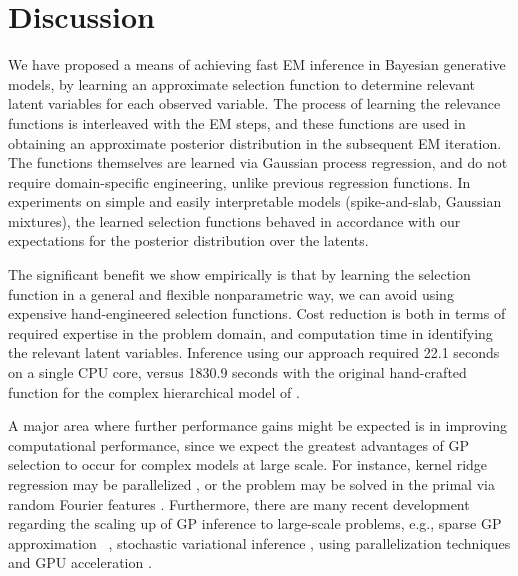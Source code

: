 \section{Discussion}
%
We have proposed a means of achieving fast EM inference in Bayesian generative models, by
learning an approximate selection function to determine relevant latent variables
for each observed variable. The process of learning the relevance functions
is interleaved with the EM steps, and these functions
are used in obtaining an approximate posterior distribution in the subsequent EM iteration.
The functions themselves are learned via Gaussian process regression,
and do not require domain-specific engineering, unlike previous regression functions.
In experiments on simple and easily interpretable models (spike-and-slab, Gaussian mixtures),
the learned selection functions behaved in accordance with our expectations for the posterior
distribution over the latents.  

The significant benefit we show empirically is that by learning the selection function in a general and flexible nonparametric way, we can avoid using expensive hand-engineered selection functions.
Cost reduction is both in terms of required expertise in the problem domain, and computation time in identifying the relevant latent variables.
Inference using our approach required 22.1 seconds on a single CPU core, versus  1830.9 seconds with the original hand-crafted function 
for the complex hierarchical model of \citep{DaiLucke2014}.


A major area where further performance gains might be expected is in
improving computational performance, since we expect the greatest
advantages of GP selection to occur for complex models at large scale. For instance,
 kernel ridge regression
may be parallelized \citep{zhang14divide},
or the problem may be solved in the primal via random Fourier features \citep{LeSarSmo13}.
Furthermore, there are many recent development regarding the scaling up of GP inference to large-scale problems, e.g., sparse GP approximation
~\citep{sparseGP}, stochastic variational inference \citep{HensmanEtAl2013,Hensman2012}, using parallelization techniques and GPU acceleration \citep{butt}.

